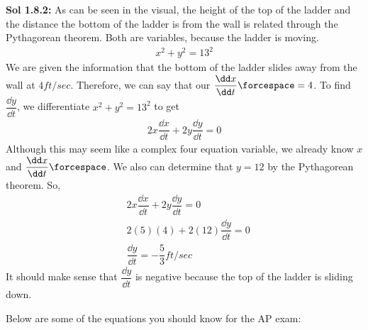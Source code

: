 \begin{tcolorbox}[solution]
    \textbf{Sol 1.8.2: } As can be seen in the visual, the height of the top of the ladder and the distance the bottom of the ladder is from the wall is related through the Pythagorean theorem. Both are variables, because the ladder is moving. \begin{align*}
        x^2 + y^2 = 13^2
    \end{align*}
    We are given the information that the bottom of the ladder slides away from the wall at $4 \si{ft \per sec}$. Therefore, we can say that our $\dfrac{\dd x}{\dd t} \forcespace = 4$. To find $\dfrac{\dd y}{\dd t}$, we differentiate $x^2 + y^2 = 13^2$ to get \begin{align*}
        2x\dfrac{\dd x}{\dd t} + 2y\dfrac{\dd y}{\dd t} = 0
    \end{align*}
    Although this may seem like a complex four equation variable, we already know $x$ and $\dfrac{\dd x}{\dd t} \forcespace$. We also can determine that $y = 12$ by the Pythagorean theorem. So, \begin{align*}
        & 2x\dfrac{\dd x}{\dd t} + 2y\dfrac{\dd y}{\dd t} = 0 \\[11pt]
        & 2(5)(4) + 2(12)\dfrac{\dd y}{\dd t} = 0 \\[11pt]
        & \dfrac{\dd y}{\dd t} = \boxed{-\dfrac{5}{3} \si{ft \per sec}}
    \end{align*}
    It should make sense that $\dfrac{\dd y}{\dd t}$ is negative because the top of the ladder is sliding down.
\end{tcolorbox}

Below are some of the equations you should know for the AP exam: \par

